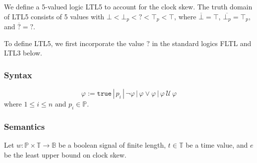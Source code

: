 \documentclass[envcountsame, runningheads]{llncs}
\newcommand{\rednote}[2][]{{\todo[color=magenta!80,size=\footnotesize,#1]{\normalcolor\normalfont#2}}}
\newcommand{\B}{\mathbb{B}}
\def\until{\,\mathcal{U}\,}
\def\since{\,\mathcal{S}\,}
\newcommand{\?}{\text{?}}
\begin{document}
	
	We define a 5-valued logic LTL5 to account for the clock skew.
	The truth domain of LTL5 consists of 5 values with $\bot < \bot_p < \? < \top_p < \top$, where $\overline{\bot} = \top$, $\overline{\bot_p} = \top_p$, and $\overline{\?} = \?$.
	
	To define LTL5, we first incorporate the value $\?$ in the standard logics FLTL and LTL3 below.
	
	\subsubsection*{Syntax}
	$$ \varphi := \texttt{true} \,|\, p_i \,|\, \lnot \varphi \,|\, \varphi \lor \varphi \,|\, \varphi \until \varphi $$ %
	where $1 \leq i \leq n $ and $p_i \in \mathbb{P}$.
	
	\subsubsection*{Semantics}
	Let $w : \mathbb{P} \times \mathbb{T} \to \B$ be a boolean signal of finite length, $t \in \mathbb{T}$ be a time value, and $e$ be the least upper bound on clock skew.
	
	
	
	
\end{document}
